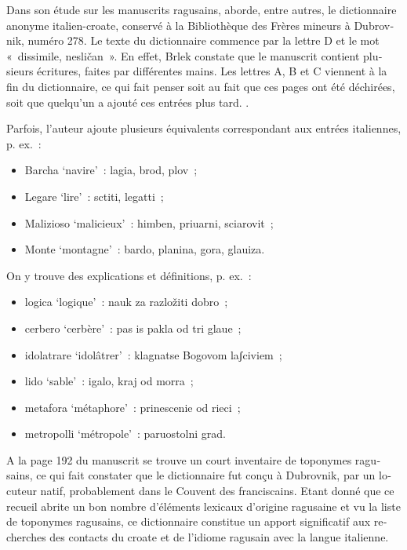 \documentclass[output=paper,colorlinks,citecolor=brown,arabicfont,chinesefont,booklanguage=french]{langscibook}
\begin{document}
\begin{otherlanguage}{french}
Dans son étude sur les manuscrits ragusains, \citet{Brlek1952} aborde, entre autres, le dictionnaire anonyme italien-croate, conservé à la Bibliothèque des Frères mineurs à Dubrovnik, numéro 278. Le texte du dictionnaire commence par la lettre D et le mot «~dissimile, nesličan~». En effet, Brlek constate que le manuscrit contient plusieurs écritures, faites par différentes mains. Les lettres A, B et C viennent à la fin du dictionnaire, ce qui fait penser soit au fait que ces pages ont été déchirées, soit que quelqu’un a ajouté ces entrées plus tard. \citep[283]{Brlek1952}.

Parfois, l’auteur ajoute plusieurs équivalents correspondant aux entrées italiennes, p. ex.~: 

\begin{itemize}
    \item Barcha ‘navire’~: lagia, brod, plov~; 
    \item Legare ‘lire’~: sctiti, legatti~; 
    \item Malizioso ‘malicieux’~: himben, priuarni, sciarovit~; 
    \item Monte ‘montagne’~: bardo, planina, gora, glauiza.
\end{itemize}

On y trouve des explications et définitions, p. ex.~: 

\begin{itemize}
    \item logica ‘logique’~: nauk za razložiti dobro~; 
    \item cerbero ‘cerbère’~: pas is pakla od tri glaue~; 
    \item idolatrare ‘idolâtrer’~: klagnatse Bogovom laʃciviem~; 
    \item lido ‘sable’~: igalo, kraj od morra~; 
    \item metafora ‘métaphore’~: prinescenie od rieci~; 
    \item metropolli ‘métropole’~: paruostolni grad. 
\end{itemize}

A la page 192 du manuscrit se trouve un court inventaire de toponymes ragusains, ce qui fait \citet{Brlek1952} constater que le dictionnaire fut conçu à Dubrovnik, par un locuteur natif, probablement dans le Couvent des franciscains. Etant donné que ce recueil abrite un bon nombre d’éléments lexicaux d’origine ragusaine et vu la liste de toponymes ragusains, ce dictionnaire constitue un apport significatif aux recherches des contacts du croate et de l’idiome ragusain avec la langue italienne.


\end{otherlanguage}
\end{document}
